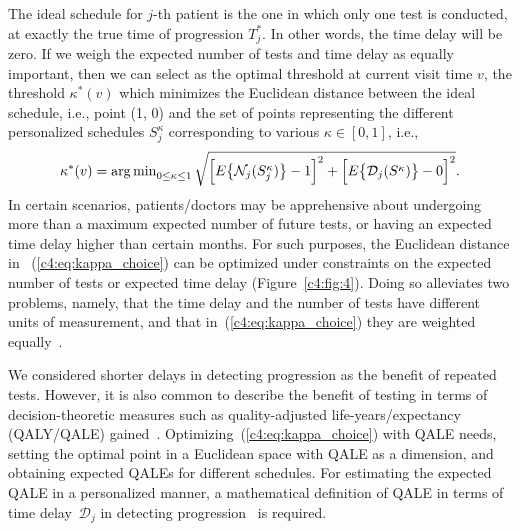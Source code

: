 The ideal schedule for $j$-th patient is the one in which only one test is conducted, at exactly the true time of progression $T^*_j$. In other words, the time delay will be zero. If we weigh the expected number of tests and time delay as equally important, then we can select as the optimal threshold at current visit time $v$, the threshold $\kappa^*(v)$ which minimizes the Euclidean distance between the ideal schedule, i.e., point (1, 0) and the set of points representing the different personalized schedules $S^{\kappa}_j$ corresponding to various $\kappa \in [0, 1]$, i.e.,
\begin{equation}
\label{c4:eq:kappa_choice}
\kappa^*(v) = \operatorname{arg\,min}_{0 \leq \kappa \leq 1} \sqrt{\Big[E\big\{\mathcal N_j(S^\kappa_j)\big\} - 1\Big]^2 + \Big[E\big\{\mathcal D_j(S^\kappa )\big\} - 0\Big]^2}.
\end{equation}
In certain scenarios, patients/doctors may be apprehensive about undergoing more than a maximum expected number of future tests, or having an expected time delay higher than certain months. For such purposes, the Euclidean distance in ~(\ref{c4:eq:kappa_choice}) can be optimized under constraints on the expected number of tests or expected time delay (Figure~\ref{c4:fig:4}). Doing so alleviates two problems, namely, that the time delay and the number of tests have different units of measurement, and that in~(\ref{c4:eq:kappa_choice}) they are weighted equally~\citep{cook1994equivalence}.

We considered shorter delays in detecting progression as the benefit of repeated tests. However, it is also common to describe the benefit of testing in terms of decision-theoretic measures such as quality-adjusted life-years/expectancy (QALY/QALE) gained~\citep{sassi2006calculating}. Optimizing~(\ref{c4:eq:kappa_choice}) with QALE needs, setting the optimal point in a Euclidean space with QALE as a dimension, and obtaining expected QALEs for different schedules. For estimating the expected QALE in a personalized manner, a mathematical definition of QALE in terms of time delay~$\mathcal{D}_j$ in detecting progression~\citep{de2017should} is required.